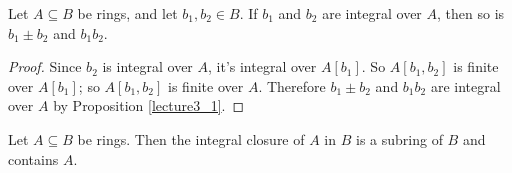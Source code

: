 \begin{lemma}
    Let $A \subseteq B$ be rings, and let $b_1, b_2 \in B$. If $b_1$ and $b_2$ are integral over $A$, then so is $b_1\pm b_2$ and $b_1b_2$.
\end{lemma}
\begin{proof}
    Since $b_2$ is integral over $A$, it's integral over $A[b_1]$. So $A[b_1, b_2]$ is finite over $A[b_1]$; so $A[b_1, b_2]$ is finite over $A$. Therefore $b_1 \pm b_2$ and $b_1b_2$ are integral over $A$ by Proposition \ref{lecture3_1}.
\end{proof}

\begin{corollary}
    Let $A \subseteq B$ be rings. Then the integral closure of $A$ in $B$ is a subring of $B$ and contains $A$.
\end{corollary}
\clearpage